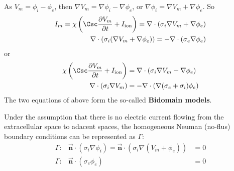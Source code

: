 As $V_m=\phi_i-\phi_e$, then $\nabla V_m=\nabla \phi_i - \nabla \phi_e$, or
$\nabla \phi_i = \nabla V_m + \nabla \phi_e$. So
\begin{equation}
\begin{split}
I_m = \chi \left( \Csc\frac{\partial V_m}{\partial t} + I_\ion \right) =
\nabla\cdot\left(\sigma_i\nabla V_m + \nabla \phi_e \right) \\
\nabla \cdot \left( \sigma_i (\nabla V_m + \nabla \phi_e) \right) =
- \nabla\cdot\left( \sigma_e \nabla \phi_e \right)
\end{split}
\end{equation}
or 
\begin{equation}
\label{eq:bidomain}
\begin{split}
\chi \left( \Csc\frac{\partial V_m}{\partial t} + I_\ion \right) &=
\nabla\cdot\left(\sigma_i\nabla V_m + \nabla \phi_e \right) \\
\nabla \cdot \left( \sigma_i \nabla V_m \right) &=
- \nabla\cdot\left( \nabla (\sigma_e + \sigma_i) \phi_e \right)
\end{split}
\end{equation}
The two equations of above form the so-called {\bf Bidomain models}.

Under the assumption that there is no electric current flowing from the
extracellular space to adacent spaces, the homogeneous Neuman (no-flus) boundary
conditions can be represented as $\Gamma$:
\begin{equation}
\begin{array}{crl}
\Gamma: & \vec{\mathbf{n}}\cdot (\sigma_i \nabla \phi_i) = \vec{\mathbf{n}}
\cdot \left(\sigma_i \nabla (V_m + \phi_e) \right) &= 0 \\
\Gamma: & \vec{\mathbf{n}}\cdot (\sigma_e \phi_e)  &= 0 
\end{array}
\end{equation}

